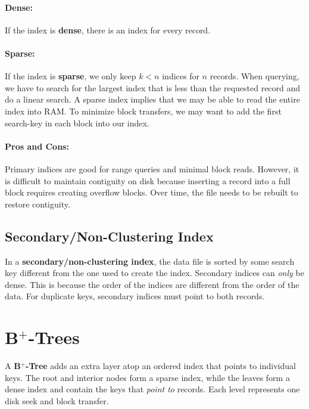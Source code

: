 \documentclass{report}
\newenvironment{definition}[1]{\begin{tcolorbox}[title={Definition: #1}]}{\end{tcolorbox}}
\renewcommand{\bf}[1]{\textbf{{#1}}}
\renewcommand{\it}[1]{\textit{{#1}}}
\begin{document}
\paragraph{Dense:} If the index is \bf{dense}, there is an index for
every record.

\paragraph{Sparse:} If the index is \bf{sparse}, we only keep $k < n$ indices
for $n$ records. When querying, we have to search for the largest index that is
less than the requested record and do a linear search. A sparse index implies
that we may be able to read the entire index into RAM. To minimize block
transfers, we may want to add the first search-key in each block into our index.

\paragraph{Pros and Cons:} Primary indices are good for range queries and
minimal block reads. However, it is difficult to maintain contiguity on disk
because inserting a record into a full block requires creating overflow blocks.
Over time, the file needs to be rebuilt to restore contiguity.

\subsection{Secondary/Non-Clustering Index}
In a \bf{secondary/non-clustering index}, the data file is sorted by some search
key different from the one used to create the index. Secondary indices can
\it{only} be dense. This is because the order of the indices are different from
the order of the data. For duplicate keys, secondary indices must point to both
records.

\section[B-plus Trees]{B$^{\bm{+}}$-Trees}
\begin{definition}{B$^+$-Tree}
    A \bf{B$^+$-Tree} adds an extra layer atop an ordered index that points to
    individual keys. The root and interior nodes form a sparse index, while the
    leaves form a dense index and contain the keys that \it{point to} records.
    Each level represents one disk seek and block transfer.
\end{definition}
\end{document}
